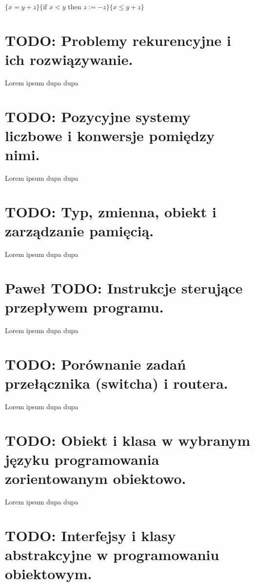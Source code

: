 \documentclass[a4paper,12pt,oneside]{book}
\begin{document}
			\begin{center}
				$\{x=y+z\}\{$if $x<y$ then $ z:=-z\}\{x\leq y+z\}$
			\end{center}
				
		\setcounter{section}{2}
		\section{\color{red} TODO: Problemy rekurencyjne i ich rozwiązywanie. }
		    
		    Lorem ipsum dupa dupa
		
		\setcounter{section}{4}
		\section{\color{red} TODO: Pozycyjne systemy liczbowe i konwersje pomiędzy nimi. }
		    
		    Lorem ipsum dupa dupa
		
		\setcounter{section}{6}
		\section{\color{red} TODO: Typ, zmienna, obiekt i zarządzanie pamięcią. }
		    
		    Lorem ipsum dupa dupa
		
		\setcounter{section}{7}
		\section{\color{green}Paweł \color{red} TODO: Instrukcje sterujące przepływem programu. }
		    
		    Lorem ipsum dupa dupa
		
		\setcounter{section}{10}
		\section{\color{red} TODO: Porównanie zadań przełącznika (switcha) i routera. }
		    
		    Lorem ipsum dupa dupa
		
		\setcounter{section}{13}
		\section{\color{red} TODO: Obiekt i klasa w wybranym języku programowania zorientowanym obiektowo. }
		    
		    Lorem ipsum dupa dupa
		
		\setcounter{section}{15}
		\section{\color{red} TODO: Interfejsy i klasy abstrakcyjne w programowaniu obiektowym. }
		    
\end{document}
